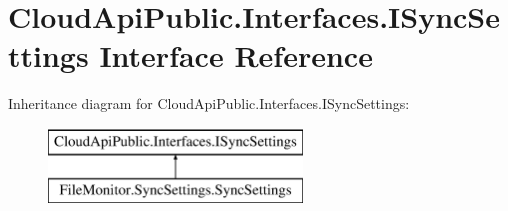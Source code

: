 \hypertarget{interface_cloud_api_public_1_1_interfaces_1_1_i_sync_settings}{\section{Cloud\-Api\-Public.\-Interfaces.\-I\-Sync\-Settings Interface Reference}
\label{interface_cloud_api_public_1_1_interfaces_1_1_i_sync_settings}
}
Inheritance diagram for Cloud\-Api\-Public.\-Interfaces.\-I\-Sync\-Settings\-:\begin{figure}[H]
\begin{center}
\leavevmode
\includegraphics[height=2.000000cm]{interface_cloud_api_public_1_1_interfaces_1_1_i_sync_settings}
\end{center}
\end{figure}
